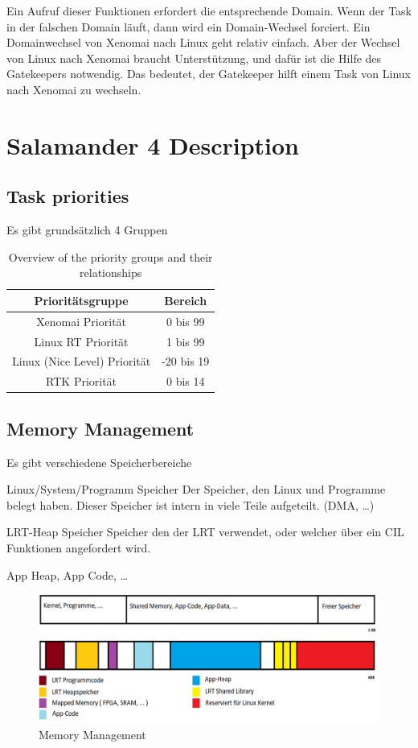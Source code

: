 \documentclass[MMR,Master,english]{twbook}
\begin{document}
\noindent Ein Aufruf dieser Funktionen erfordert die entsprechende Domain. Wenn der Task in der falschen Domain läuft, dann wird ein Domain-Wechsel forciert.
Ein Domainwechsel von Xenomai nach Linux geht relativ einfach. Aber der Wechsel von Linux nach Xenomai braucht Unterstützung, und dafür ist die Hilfe des Gatekeepers notwendig. Das bedeutet, der Gatekeeper hilft einem Task von Linux nach Xenomai zu wechseln.

\clearpage
\section{Salamander 4 Description}

\subsection{Task priorities}
Es gibt grundsätzlich 4 Gruppen

\begin{table}[ht]
	\centering
	\caption{Overview of the priority groups and their relationships}
	\label{tab:priorities}
	\begin{tabular}{|c|c|}
		\hline
		\textbf{Prioritätsgruppe}    & \textbf{Bereich} \\ \hline
		Xenomai Priorität            & 0 bis 99         \\ \hline
		Linux RT Priorität           & 1 bis 99         \\ \hline
		Linux (Nice Level) Priorität & -20 bis 19       \\ \hline
		RTK Priorität                & 0 bis 14         \\ \hline
	\end{tabular}
\end{table}
\clearpage

\subsection{Memory Management}
Es gibt verschiedene Speicherbereiche

Linux/System/Programm Speicher
Der Speicher, den Linux und Programme belegt haben.
Dieser Speicher ist intern in viele Teile aufgeteilt. (DMA, …)

LRT-Heap Speicher
Speicher den der LRT verwendet, oder welcher über ein CIL Funktionen
angefordert wird.

App Heap, App Code, …


\begin{figure}[H]
	\centering
	\includegraphics[width=0.8\columnwidth]{img/RAM_Memory_management.png}
	\caption[Memory Management]{Memory Management}
	\label{fig:memory_management}
\end{figure}
\end{document}
